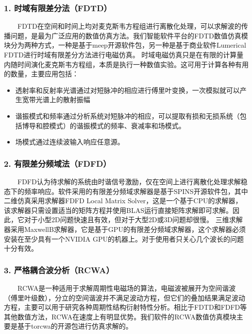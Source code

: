\documentclass[a4paper,10pt,english]{sphinxmanual}
\begin{document}
\subsubsection{1. 时域有限差分法（FDTD）}
\label{\detokenize{_u7b80_u4ecb/_u6838_u5fc3_u8bbe_u8ba1_u4f18_u5316_u7b97_u6cd5/_u6570_u503c_u4eff_u771f_u6a21_u5757/_u6570_u503c_u4eff_u771f_u7b97_u6cd5:fdtd}}
\sphinxAtStartPar
  FDTD在空间和时间上均对麦克斯韦方程组进行离散化处理，可以求解波的传播问题，是最为广泛应用的数值仿真方法。我们智能软件平台的FDTD数值仿真模块分为两种方式，一种是基于meep开源软件包，另一种是基于商业软件Lumerical FDTD进行时域有限差分方法进行电磁仿真。
时域电磁仿真只是在有限的计算量内随时间演化麦克斯韦方程组，本质是执行一种数值实验。这可用于计算各种有用的数量，主要应用包括：
\begin{itemize}
\item {} 
\sphinxAtStartPar
透射率和反射率光谱\textendash{}通过对短脉冲的相应进行傅里叶变换，一次模拟就可以产生宽带光谱上的散射振幅

\item {} 
\sphinxAtStartPar
谐振模式和频率\textendash{}通过分析系统对短脉冲的相应，可以提取有损和无损系统（包括博导和腔模式）的谐振模式的频率、衰减率和场模式。

\item {} 
\sphinxAtStartPar
场模式\textendash{}通过连续波输入响应任意源。

\end{itemize}


\subsubsection{2. 有限差分频域法（FDFD）}
\label{\detokenize{_u7b80_u4ecb/_u6838_u5fc3_u8bbe_u8ba1_u4f18_u5316_u7b97_u6cd5/_u6570_u503c_u4eff_u771f_u6a21_u5757/_u6570_u503c_u4eff_u771f_u7b97_u6cd5:fdfd}}
\sphinxAtStartPar
  FDFD认为待求解的系统由时谐信号激励，仅在空间上进行离散化处理求解稳态下的频率响应。软件采用的有限差分频域求解器是基于SPINS开源软件包，其中二维仿真采用求解器FDFD Local Matrix Solver，这是一个基于CPU的求解器，该求解器只需设置适当的矩阵方程并使用BLAS运行直接矩阵求解即可求解。因此，它对于小型2D问题快速且有效，但对于大型2D或3D问题却很慢。
三维求解器采用Maxwell\sphinxhyphen{}B求解器，它是基于GPU的有限差分频域求解器，这个求解器必须安装在至少具有一个NVIDIA GPU的机器上。对于使用者只关心几个波长的问题十分有效。


\subsubsection{3. 严格耦合波分析（RCWA）}
\label{\detokenize{_u7b80_u4ecb/_u6838_u5fc3_u8bbe_u8ba1_u4f18_u5316_u7b97_u6cd5/_u6570_u503c_u4eff_u771f_u6a21_u5757/_u6570_u503c_u4eff_u771f_u7b97_u6cd5:rcwa}}
\sphinxAtStartPar
  RCWA是一种适用于求解周期性电磁场的算法，电磁波被展开为空间谐波（傅里叶级数），分立的空间谐波并不满足波动方程，但它们的叠加结果满足波动方程，主要可以用于研究各种周期性结构衍射特性分析。相比于FDTD和FDFD等其他数值方法，RCWA在速度上有明显优势。我们软件的RCWA数值仿真模块主要是基于torcwa的开源包进行仿真求解的。
\end{document}
